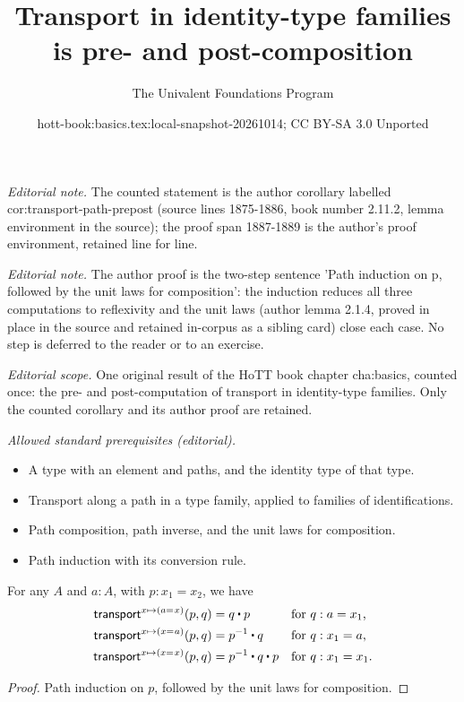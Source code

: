 \documentclass[10pt,a4paper]{article}
\title{Transport in identity-type families is pre- and post-composition}
\author{The Univalent Foundations Program}
\date{hott-book:basics.tex:local-snapshot-20261014; CC BY-SA 3.0 Unported}
\newcounter{chapter}
\newcommand{\id}[3][]{\ensuremath{#2 =_{#1} #3}\xspace}
\newcommand{\ct}{%
  \mathchoice{\mathbin{\raisebox{0.5ex}{$\displaystyle\centerdot$}}}%
             {\mathbin{\raisebox{0.5ex}{$\centerdot$}}}%
             {\mathbin{\raisebox{0.25ex}{$\scriptstyle\,\centerdot\,$}}}%
             {\mathbin{\raisebox{0.1ex}{$\scriptscriptstyle\,\centerdot\,$}}}
}
\newcommand{\opp}[1]{\mathord{{#1}^{-1}}}
\newcommand{\transfib}[3]{\ensuremath{\mathsf{transport}^{#1}(#2,#3)\xspace}}
\theoremstyle{definition}
\theoremstyle{remark}
\numberwithin{equation}{section}
\begin{document}
\maketitle
\noindent\textit{Editorial note.} The counted statement is the author corollary labelled cor:transport-path-prepost (source lines 1875-1886, book number 2.11.2, lemma environment in the source); the proof span 1887-1889 is the author's proof environment, retained line for line.\par\medskip
\noindent\textit{Editorial note.} The author proof is the two-step sentence 'Path induction on p, followed by the unit laws for composition': the induction reduces all three computations to reflexivity and the unit laws (author lemma 2.1.4, proved in place in the source and retained in-corpus as a sibling card) close each case. No step is deferred to the reader or to an exercise.\par\medskip
\noindent\textit{Editorial scope.} One original result of the HoTT book chapter cha:basics, counted once: the pre- and post-computation of transport in identity-type families. Only the counted corollary and its author proof are retained.\par\medskip
\noindent\textit{Allowed standard prerequisites (editorial).}\begin{itemize}
\item A type with an element and paths, and the identity type of that type.
\item Transport along a path in a type family, applied to families of identifications.
\item Path composition, path inverse, and the unit laws for composition.
\item Path induction with its conversion rule.
\end{itemize}\medskip
\begin{lem}\label{cor:transport-path-prepost}
  For any $A$ and $a:A$, with $p:x_1=x_2$, we have
  \begin{align*}
    \transfib{x \mapsto (\id{a}{x})} {p} {q} &= q \ct p
    & &\text{for $q:a=x_1$,}\\
    \transfib{x \mapsto (\id{x}{a})} {p} {q} &= \opp {p} \ct q
    & &\text{for $q:x_1=a$,}\\
    \transfib{x \mapsto (\id{x}{x})} {p} {q} &= \opp{p} \ct q \ct p
    & &\text{for $q:x_1=x_1$.}
  \end{align*}
\end{lem}

\begin{proof}
  Path induction on $p$, followed by the unit laws for composition.
\end{proof}
\end{document}
